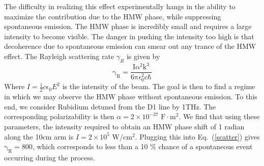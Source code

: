 The difficulty in realizing this effect experimentally hangs in the ability to maximize the contribution due to the HMW phase, while suppressing spontaneous emission. The HMW phase is incredibly small and requires a large intensity to become visible. The danger in pushing the intensity too high is that decoherence due to spontaneous emission can smear out any trance of the HMW effect. The Rayleigh scattering rate $\gamma_{R}$ is given by
\begin{equation}
\mathrm{\gamma_{R}=\frac{I\alpha ^2 k^3}{6 \pi\epsilon_{0}^2 c\hbar}}
\label{scatter}
\end{equation}
Where $I=\frac{1}{2}c\epsilon_0 E^2$ is the intensity of the beam. The goal is then to find a regime in which we may observe the HMW phase without spontaneous emission.
To this end, we consider Rubidium detuned from the D1 line by 1THz.  The corresponding polarizability is then  $\alpha=2\times10^{-37}\, \,\mathrm{F\cdot m^2}$.  We find that using these parameters, the intensity required to obtain an HMW phase shift of 1 radian along the 10cm arm is $I=2\times 10^5 \,\, \mathrm{W/cm^2}$. Plugging this into  Eq.\ (\ref{scatter}) gives $\mathrm{\gamma_{R}}=800$, which corresponds to less than a 10 \% chance of a spontaneous event occurring during the process.

 

\vspace{5mm}


